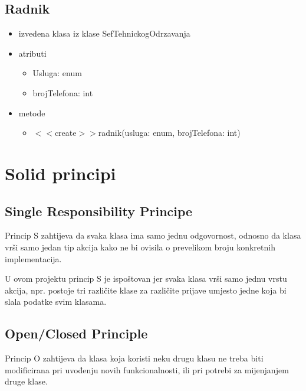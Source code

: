 \documentclass{article}
\begin{document}
 
 
\subsection*{Radnik}
 
\begin{itemize}
  \item izvedena klasa iz klase SefTehnickogOdrzavanja
  \item atributi
     \begin{itemize}
        \item Usluga: enum
        \item brojTelefona: int
     \end{itemize}
  \item metode
  \begin{itemize}
        \item \(<<\)create\(>>\)radnik(usluga: enum, brojTelefona: int)
       
     \end{itemize}
 
\end{itemize}



\newpage

\section{Solid principi}

\subsection{Single Responsibility Principe} 

\hspace{\indent}Princip S zahtijeva da svaka klasa ima samo jednu odgovornost, odnosno da klasa vrši samo jedan tip akcija kako ne bi ovisila o prevelikom broju konkretnih implementacija. 

U ovom projektu princip S je ispoštovan jer svaka klasa vrši samo jednu vrstu akcija, npr. postoje tri različite klase za različite prijave umjesto jedne koja bi slala podatke svim klasama. 

\subsection{Open/Closed Principle}

\hspace{\indent}Princip O zahtijeva da klasa koja koristi neku drugu klasu ne treba biti modificirana pri uvođenju novih funkcionalnosti, ili pri potrebi za mijenjanjem druge klase.
\end{document}
